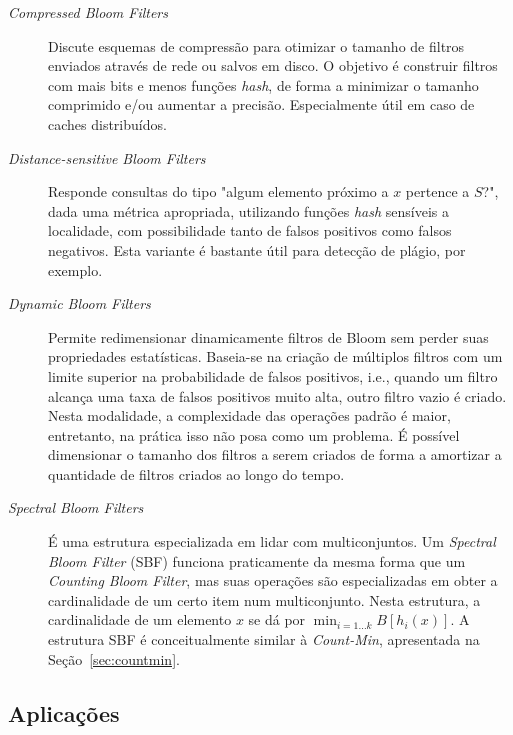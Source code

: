 \begin{description}

  \item[\emph{Compressed Bloom Filters} \cite{mitzenmacher2002compressed}] 
    Discute esquemas de compressão para otimizar o tamanho de filtros enviados através de rede ou salvos em disco. O objetivo é construir filtros com mais bits e menos funções \emph{hash}, de forma a minimizar o tamanho comprimido e/ou aumentar a precisão. Especialmente útil em caso de caches distribuídos. 

  \item[\emph{Distance-sensitive Bloom Filters} \cite{kirsch2006distance}] 
    Responde consultas do tipo "algum elemento próximo a $x$ pertence a $S$?", dada uma métrica apropriada, utilizando funções \emph{hash} sensíveis a localidade, com possibilidade tanto de falsos positivos como falsos negativos. Esta variante é bastante útil para detecção de plágio, por exemplo.

  \item[\emph{Dynamic Bloom Filters} \cite{guo2010dynamic}] 
    Permite redimensionar dinamicamente filtros de Bloom sem perder suas propriedades estatísticas. Baseia-se na criação de múltiplos filtros com um limite superior na probabilidade de falsos positivos, i.e., quando um filtro alcança uma taxa de falsos positivos muito alta, outro filtro vazio é criado. Nesta modalidade, a complexidade das operações padrão é maior, entretanto, na prática isso não posa como um problema. É possível dimensionar o tamanho dos filtros a serem criados de forma a amortizar a quantidade de filtros criados ao longo do tempo.

  \item[\emph{Spectral Bloom Filters} \cite{cohen2003spectral}] 
    É uma estrutura especializada em lidar com multiconjuntos. Um \emph{Spectral Bloom Filter} (SBF) funciona praticamente da mesma forma que um \emph{Counting Bloom Filter}, mas suas operações são especializadas em obter a cardinalidade de um certo item num multiconjunto. Nesta estrutura, a cardinalidade de um elemento $x$ se dá por $\displaystyle \min_{i = 1 \dots k} B[h_i(x)]$. A estrutura SBF é conceitualmente similar à \emph{Count-Min}, apresentada na Seção~\ref{sec:countmin}.

\end{description}


\subsection{Aplicações}\label{sec:bloom:apps}

